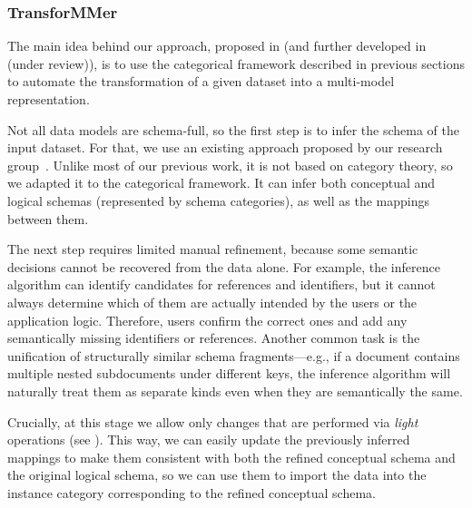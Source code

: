 
\subsubsection{TransforMMer}

The main idea behind our approach, proposed in  (and further developed in~\citep{is_2026} (under review)), is to use the categorical framework described in previous sections to automate the transformation of a given dataset into a multi-model representation.

Not all data models are schema-full, so the first step is to infer the schema of the input dataset. For that, we use an existing approach proposed by our research group~\citep{mm_infer, koupil2022mminfer}. Unlike most of our previous work, it is not based on category theory, so we adapted it to the categorical framework. It can infer both conceptual and logical schemas (represented by schema categories), as well as the mappings between them.

The next step requires limited manual refinement,
because some semantic decisions cannot be recovered from the data alone. For example, the inference algorithm can identify candidates for references and identifiers, but it cannot always determine which of them are actually intended by the users or the application logic. Therefore, users confirm the correct ones and add any semantically missing identifiers or references. Another common task is the unification of structurally similar schema fragments---e.g., if a document contains multiple nested subdocuments under different keys, the inference algorithm will naturally treat them as separate kinds even when they are semantically the same.

Crucially, at this stage we allow only changes that are performed via \emph{light} operations (see ). This way, we can easily update the previously inferred mappings to make them consistent with both the refined conceptual schema and the original logical schema, so we can use them to import the data into the instance category corresponding to the refined conceptual schema.


